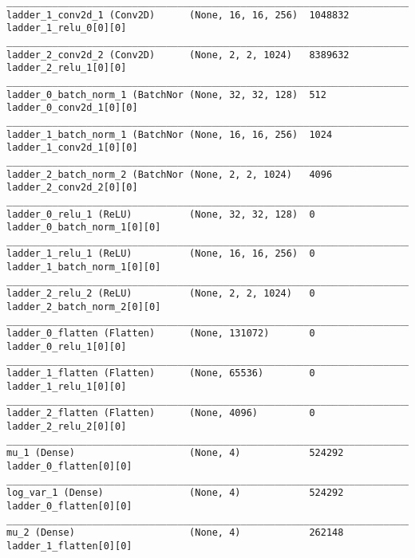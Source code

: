 \begin{lstlisting}[caption={dSprites-VLAE-GAN Encoder},captionpos=b,basicstyle=\tiny, label={lst:mnist-vlae-gan-encoder}]
__________________________________________________________________________________________________
ladder_1_conv2d_1 (Conv2D)      (None, 16, 16, 256)  1048832     ladder_1_relu_0[0][0]
__________________________________________________________________________________________________
ladder_2_conv2d_2 (Conv2D)      (None, 2, 2, 1024)   8389632     ladder_2_relu_1[0][0]
__________________________________________________________________________________________________
ladder_0_batch_norm_1 (BatchNor (None, 32, 32, 128)  512         ladder_0_conv2d_1[0][0]
__________________________________________________________________________________________________
ladder_1_batch_norm_1 (BatchNor (None, 16, 16, 256)  1024        ladder_1_conv2d_1[0][0]
__________________________________________________________________________________________________
ladder_2_batch_norm_2 (BatchNor (None, 2, 2, 1024)   4096        ladder_2_conv2d_2[0][0]
__________________________________________________________________________________________________
ladder_0_relu_1 (ReLU)          (None, 32, 32, 128)  0           ladder_0_batch_norm_1[0][0]
__________________________________________________________________________________________________
ladder_1_relu_1 (ReLU)          (None, 16, 16, 256)  0           ladder_1_batch_norm_1[0][0]
__________________________________________________________________________________________________
ladder_2_relu_2 (ReLU)          (None, 2, 2, 1024)   0           ladder_2_batch_norm_2[0][0]
__________________________________________________________________________________________________
ladder_0_flatten (Flatten)      (None, 131072)       0           ladder_0_relu_1[0][0]
__________________________________________________________________________________________________
ladder_1_flatten (Flatten)      (None, 65536)        0           ladder_1_relu_1[0][0]
__________________________________________________________________________________________________
ladder_2_flatten (Flatten)      (None, 4096)         0           ladder_2_relu_2[0][0]
__________________________________________________________________________________________________
mu_1 (Dense)                    (None, 4)            524292      ladder_0_flatten[0][0]
__________________________________________________________________________________________________
log_var_1 (Dense)               (None, 4)            524292      ladder_0_flatten[0][0]
__________________________________________________________________________________________________
mu_2 (Dense)                    (None, 4)            262148      ladder_1_flatten[0][0]

\end{lstlisting}
